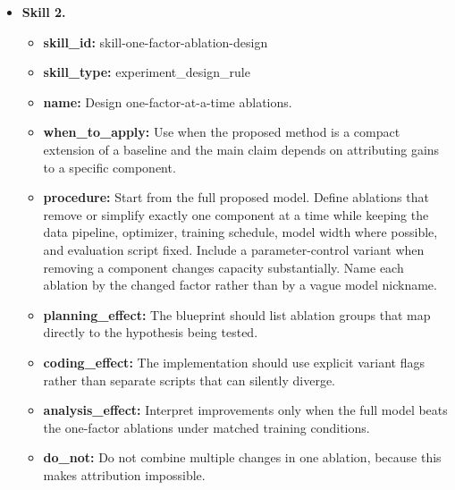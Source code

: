 \documentclass{opendatalab}
\begin{document}
\begin{tcolorbox}
\begin{itemize}
  \item \textbf{Skill 2.}
  \begin{itemize}\setlength\itemsep{1pt}
    \item \textbf{skill\_id:} skill-one-factor-ablation-design
    \item \textbf{skill\_type:} experiment\_design\_rule
    \item \textbf{name:} Design one-factor-at-a-time ablations.
    \item \textbf{when\_to\_apply:} Use when the proposed method is a compact extension of a baseline and the main claim depends on attributing gains to a specific component.
    \item \textbf{procedure:} Start from the full proposed model. Define ablations that remove or simplify exactly one component at a time while keeping the data pipeline, optimizer, training schedule, model width where possible, and evaluation script fixed. Include a parameter-control variant when removing a component changes capacity substantially. Name each ablation by the changed factor rather than by a vague model nickname.
    \item \textbf{planning\_effect:} The blueprint should list ablation groups that map directly to the hypothesis being tested.
    \item \textbf{coding\_effect:} The implementation should use explicit variant flags rather than separate scripts that can silently diverge.
    \item \textbf{analysis\_effect:} Interpret improvements only when the full model beats the one-factor ablations under matched training conditions.
    \item \textbf{do\_not:} Do not combine multiple changes in one ablation, because this makes attribution impossible.
  \end{itemize}
\end{itemize}
\end{tcolorbox}
\end{document}

